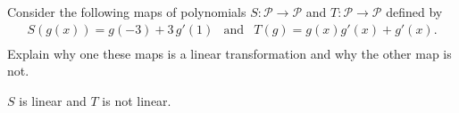 
\begin{exerciseStatement}


Consider the following maps of polynomials \(S:\mathcal{P}\rightarrow\mathcal{P}\) and \(T:\mathcal{P}\rightarrow\mathcal{P}\) defined by 
\begin{align*} S(g(x))= g\left(-3\right) + 3 \, g'\left(1\right)  & \text{and} & T(g)= g\left(x\right) g'\left(x\right) + g'\left(x\right) . \\ \end{align*}
             Explain why one these maps is a linear transformation and why the other map is not. 


\end{exerciseStatement}
    
\begin{exerciseAnswer} 


\(S\) is linear and \(T\) is not linear.


\end{exerciseAnswer}
    
